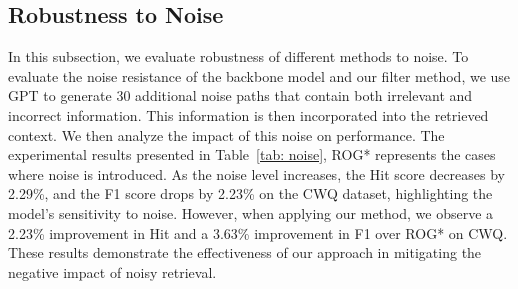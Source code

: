 \documentclass[11pt]{article}
\begin{document}
\begin{table}[h]
    \centering

\caption{Performance when adding more noise}   \label{tab: noise}

\end{table}


\subsection{Robustness to Noise }
In this subsection, we evaluate robustness of different methods to noise.  To evaluate the noise resistance of the backbone model and our filter method, we use GPT to generate 30 additional noise paths that contain both irrelevant and incorrect information. This information is then incorporated into the retrieved context. We then analyze the impact of this noise on performance. The experimental results presented in Table~\ref{tab: noise}, ROG* represents the cases where noise is introduced. As the noise level increases, the Hit score decreases by 2.29\%, and the F1 score drops by 2.23\% on the CWQ dataset, highlighting the model's sensitivity to noise. However, when applying our method, we observe a 2.23\% improvement in Hit and a 3.63\% improvement in F1 over ROG* on CWQ. These results demonstrate the effectiveness of our approach in mitigating the negative impact of noisy retrieval.
\end{document}
